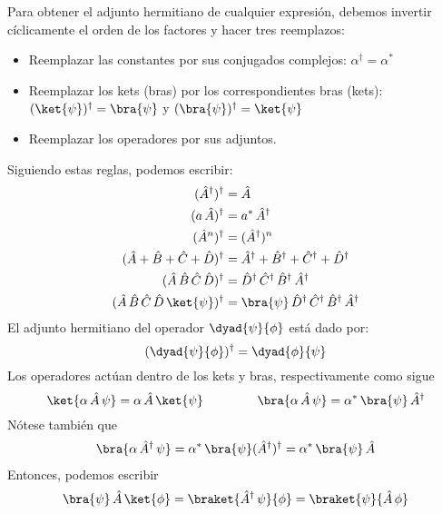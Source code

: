 Para obtener el adjunto hermitiano de cualquier expresión, debemos invertir cíclicamente el orden de los factores y hacer tres reemplazos:
\begin{itemize}
\item Reemplazar las constantes por sus conjugados complejos: $\alpha^{\dagger} = \alpha^{*}$
\item Reemplazar los kets (bras) por los correspondientes bras (kets): $(\ket{\psi})^{\dagger} = \bra{\psi}$ y $(\bra{\psi})^{\dagger} = \ket{\psi}$
\item Reemplazar los operadores por sus adjuntos.
\end{itemize}
Siguiendo estas reglas, podemos escribir:
\begin{align}
(\hat{A}^{\dagger})^{\dagger} &= \hat{A} \label{eq:ecuacion_02_61} \\
(a \, \hat{A})^{\dagger} &= a^{*} \, \hat{A}^{\dagger} \label{eq:ecuacion_02_62} \\
(\hat{A}^{n})^{\dagger} &= (\hat{A}^{\dagger})^{n} \label{eq:ecuacion_02_63} \\
(\hat{A} + \hat{B} + \hat{C} + \hat{D})^{\dagger} &= \hat{A}^{\dagger} + \hat{B}^{\dagger} + \hat{C}^{\dagger} + \hat{D}^{\dagger} \label{eq:ecuacion_02_64} \\
(\hat{A} \, \hat{B} \, \hat{C} \, \hat{D})^{\dagger} &= \hat{D}^{\dagger} \, \hat{C}^{\dagger} \, \hat{B}^{\dagger} \, \hat{A}^{\dagger} \label{eq:ecuacion_02_65} \\
(\hat{A} \, \hat{B} \, \hat{C} \, \hat{D} \, \ket{\psi})^{\dagger} &= \bra{\psi} \, \hat{D}^{\dagger} \, \hat{C}^{\dagger} \, \hat{B}^{\dagger} \, \hat{A}^{\dagger} \label{eq:ecuacion_02_66}
\end{align}
El adjunto hermitiano del operador $\dyad{\psi}{\phi}$ está dado por:
\begin{equation}
(\dyad{\psi}{\phi})^{\dagger} = \dyad{\phi}{\psi}
\label{eq:ecuacion_02_67}
\end{equation}
Los operadores actúan dentro de los kets y bras, respectivamente como sigue
\begin{equation}
\ket{\alpha \, \hat{A} \, \psi} = \alpha \, \hat{A} \, \ket{\psi} \hspace{1.5cm} \bra{\alpha \, \hat{A} \, \psi} = \alpha^{*} \, \bra{\psi} \, \hat{A}^{\dagger} \label{eq:ecuacion_02_68}
\end{equation}
Nótese también que
\begin{align*}
\bra{\alpha \, \hat{A}^{\dagger} \, \psi} = \alpha^{*} \, \bra{\psi} (\hat{A}^{\dagger})^{\dagger} = \alpha^{*} \, \bra{\psi} \, \hat{A}
\end{align*}
Entonces, podemos escribir
\begin{equation}
\bra{\psi} \, \hat{A} \, \ket{\phi} = \braket{\hat{A}^{\dagger} \, \psi}{\phi} = \braket{\psi}{\hat{A} \, \phi}
\label{eq:ecuacion_02_69}
\end{equation}

